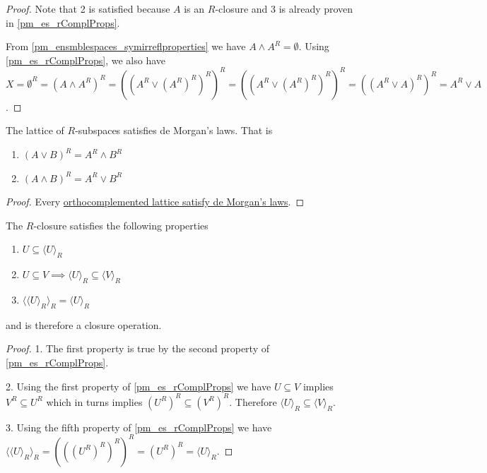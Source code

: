 \begin{mathSection}
	\begin{proof}
		Note that 2 is satisfied because $A$ is an $R$-closure and 3 is already proven in \ref{pm_es_rComplProps}.
		
		From \ref{pm_ensmblespaces_symirreflproperties} we have $A \wedge A^{R} = \emptyset$. Using \ref{pm_es_rComplProps}, we also have $X = \emptyset^{R} = (A \wedge A^{R}) ^{R} = ((A^{R} \vee (A^{R})^{R})^{R})^{R} = ((A^{R} \vee (A^{R})^{R})^{R})^{R} = ((A^{R} \vee A)^{R})^{R} = A^{R} \vee A$.
	\end{proof}
	
	\begin{coro}
		The lattice of $R$-subspaces satisfies de Morgan's laws. That is
		\begin{enumerate}
			\item $(A \vee B)^{R} = A^{R} \wedge B^{R}$
			\item $(A \wedge B)^{R} = A^{R} \vee B^{R}$
		\end{enumerate}
	\end{coro}
	
	\begin{proof}
		Every \href{https://en.wikipedia.org/wiki/Complemented_lattice#Orthocomplementation}{orthocomplemented lattice satisfy de Morgan's laws}.
	\end{proof}
	
	\begin{coro}\label{pm_es_subspaceClosure}
		The $R$-closure satisfies the following properties
		\begin{enumerate}
			\item $U \subseteq \langle U \rangle_R$
			\item $U \subseteq V \implies \langle U \rangle_R \subseteq \langle V \rangle_R$
			\item $\langle \langle U \rangle_R \rangle_R = \langle U \rangle_R $
		\end{enumerate}
		and is therefore a closure operation.
	\end{coro}
	
	\begin{proof}
		1. The first property is true by the second property of \ref{pm_es_rComplProps}.
		
		2. Using the first property of \ref{pm_es_rComplProps} we have $U \subseteq V$ implies $V^{R} \subseteq U^{R}$ which in turns implies $(U^{R})^{R} \subseteq (V^{R})^{R}$. Therefore $\langle U \rangle_R \subseteq \langle V \rangle_R$.
		
		3. Using the fifth property of \ref{pm_es_rComplProps} we have $\langle \langle U \rangle_R \rangle_R = (((U^{R})^{R})^{R})^{R} = (U^{R})^{R} = \langle U \rangle_R$.
	\end{proof}
	

\end{mathSection}
